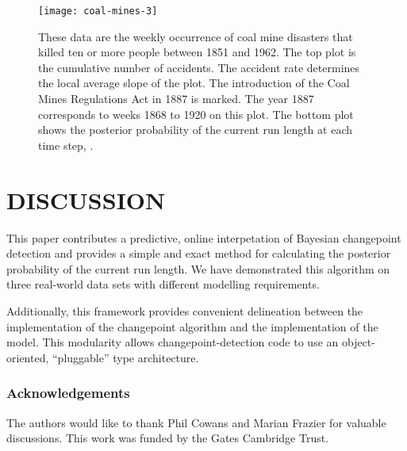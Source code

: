 \documentclass[]{article}
\begin{document}
      \begin{figure*}[t]
	\centering
	\texttt{[image: coal-mines-3]}
	\vskip -0.4cm
	\caption{These data are the weekly occurrence of coal mine
	disasters that killed ten or more people between 1851 and 1962.
	The top plot is the cumulative number of accidents.  The accident
	rate determines the local average slope of the plot.  The
	introduction of the Coal Mines Regulations Act in 1887 is marked.
	The year 1887 corresponds to weeks 1868 to 1920 on this plot.  The
	bottom plot shows the posterior probability of the current run
	length at each time step, .}
	\label{fig:coal-mines}
      \end{figure*}

  \section{DISCUSSION}
    This paper contributes a predictive, online interpetation of Bayesian
    changepoint detection and provides a simple and exact method for
    calculating the posterior probability of the current run length.  We
    have demonstrated this algorithm on three real-world data sets with
    different modelling requirements.

    Additionally, this framework provides convenient delineation between
    the implementation of the changepoint algorithm and the implementation
    of the model.  This modularity allows changepoint-detection code to use
    an object-oriented, ``pluggable'' type architecture.
    
  \subsubsection*{Acknowledgements}
    The authors would like to thank Phil Cowans and Marian Frazier for
    valuable discussions.  This work was funded by the Gates Cambridge
    Trust.

  
  
  
\end{document}
